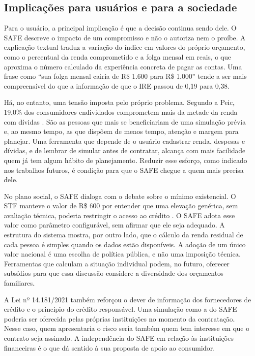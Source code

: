\documentclass[portuguese]{sbc2025}%
\begin{document}
\subsection{Implicações para usuários e para a sociedade}

Para o usuário, a principal implicação é que a decisão continua sendo dele. O SAFE descreve o impacto de um compromisso e não o autoriza nem o proíbe. A explicação textual traduz a variação do índice em valores do próprio orçamento, como o percentual da renda comprometido e a folga mensal em reais, o que aproxima o número calculado da experiência concreta de pagar as contas. Uma frase como ``sua folga mensal cairia de R\$ 1.600 para R\$ 1.000'' tende a ser mais compreensível do que a informação de que o IRE passou de 0,19 para 0,38.

Há, no entanto, uma tensão imposta pelo próprio problema. Segundo a Peic, 19,0\% dos consumidores endividados comprometem mais da metade da renda com dívidas \citep{peic2026}. São as pessoas que mais se beneficiariam de uma simulação prévia e, ao mesmo tempo, as que dispõem de menos tempo, atenção e margem para planejar. Uma ferramenta que depende de o usuário cadastrar renda, despesas e dívidas, e de lembrar de simular antes de contratar, alcança com mais facilidade quem já tem algum hábito de planejamento. Reduzir esse esforço, como indicado nos trabalhos futuros, é condição para que o SAFE chegue a quem mais precisa dele.

No plano social, o SAFE dialoga com o debate sobre o mínimo existencial. O STF manteve o valor de R\$ 600 por entender que uma elevação genérica, sem avaliação técnica, poderia restringir o acesso ao crédito \citep{stf2026}. O SAFE adota esse valor como parâmetro configurável, sem afirmar que ele seja adequado. A estrutura do sistema mostra, por outro lado, que o cálculo da renda residual de cada pessoa é simples quando os dados estão disponíveis. A adoção de um único valor nacional é uma escolha de política pública, e não uma imposição técnica. Ferramentas que calculam a situação individual podem, no futuro, oferecer subsídios para que essa discussão considere a diversidade dos orçamentos familiares.

A Lei nº 14.181/2021 também reforçou o dever de informação dos fornecedores de crédito e o princípio do crédito responsável. Uma simulação como a do SAFE poderia ser oferecida pelas próprias instituições no momento da contratação. Nesse caso, quem apresentaria o risco seria também quem tem interesse em que o contrato seja assinado. A independência do SAFE em relação às instituições financeiras é o que dá sentido à sua proposta de apoio ao consumidor.
\end{document}
